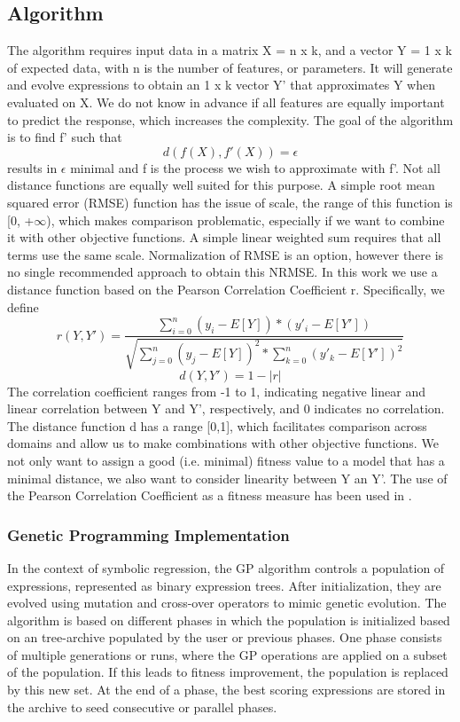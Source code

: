 
\subsection{Algorithm}
The algorithm requires input data in a matrix X = n x k, and a vector Y = 1 x k of expected data, with n is the number of features, or parameters. It will generate and evolve expressions to obtain an 1 x k vector Y' that approximates Y when evaluated on X. We do not know in advance if all features are equally important to predict the response, which increases the complexity.
The goal of the algorithm is to find f' such that
\[
d(f(X), f'(X))=\epsilon
\]
results in $\epsilon$ minimal and f is the process we wish to approximate with f'.
Not all distance functions are equally well suited for this purpose. A simple root mean squared error (RMSE) function has the issue of scale, the range of this function is [0, +$\infty$), which makes comparison problematic, especially if we want to combine it with other objective functions. A simple linear weighted sum requires that all terms use the same scale.
Normalization of RMSE is an option, however there is no single recommended approach to obtain this NRMSE.
In this work we use a distance function based on the Pearson Correlation Coefficient r. Specifically, we define
\[
r(Y, Y') = \frac{\sum_{i=0}^{n}{(y_i-E[Y])*(y'_i-E[Y'])}}{\sqrt{\sum_{j=0}^{n}{(y_j-E[Y])^2}*\sum_{k=0}^{n}{(y'_k-E[Y'])^2}}}
\]
\[
d(Y, Y') = 1 - 
\lvert r
 \lvert 
 \]
The correlation coefficient ranges from -1 to 1, indicating negative linear and linear correlation between Y and Y', respectively, and 0 indicates no correlation. The distance function d has a range [0,1], which facilitates comparison across domains and allow us to make combinations with other objective functions. We not only want to assign a good (i.e. minimal) fitness value to a model that has a minimal distance, we also want to consider linearity between Y an Y'. The use of the Pearson Correlation Coefficient as a fitness measure has been used in \citep{pearson}.

\subsubsection{Genetic Programming Implementation}
In the context of symbolic regression, the GP algorithm controls a population of expressions, represented as binary expression trees. After initialization, they are evolved using mutation and cross-over operators to mimic genetic evolution.
The algorithm is based on different phases in which the population is initialized based on an tree-archive populated by the user or previous phases. One phase consists of multiple generations or runs, where the GP operations are applied on a subset of the population. If this leads to fitness improvement, the population is replaced by this new set. At the end of a phase, the best scoring expressions are stored in the archive to seed consecutive or parallel phases.

